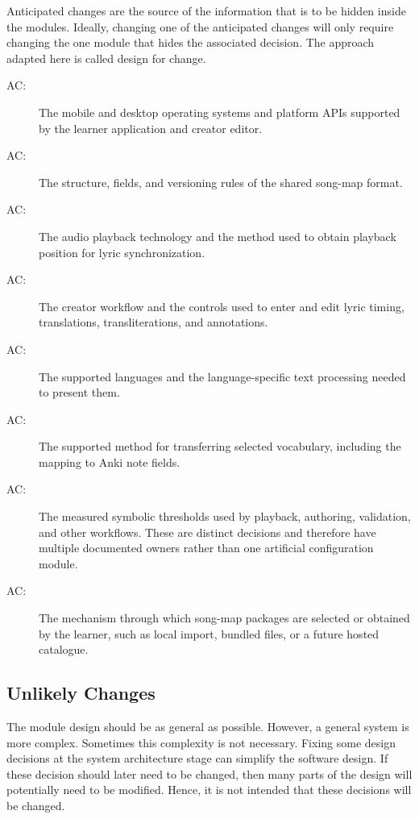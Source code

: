 \documentclass[12pt, titlepage]{article}
\newcounter{acnum}
\newcommand{\actheacnum}{AC\theacnum}
\begin{document}
Anticipated changes are the source of the information that is to be hidden
inside the modules. Ideally, changing one of the anticipated changes will only
require changing the one module that hides the associated decision. The approach
adapted here is called design for
change.

\begin{description}
\item[ \actheacnum \label{acPlatforms}:] The mobile and
  desktop operating systems and platform APIs supported by the learner
  application and creator editor.
\item[ \actheacnum \label{acSongMap}:] The structure,
  fields, and versioning rules of the shared song-map format.
\item[ \actheacnum \label{acAudio}:] The audio playback
  technology and the method used to obtain playback position for lyric
  synchronization.
\item[ \actheacnum \label{acAuthoring}:] The creator
  workflow and the controls used to enter and edit lyric timing, translations,
  transliterations, and annotations.
\item[ \actheacnum \label{acLanguage}:] The supported
  languages and the language-specific text processing needed to present them.
\item[ \actheacnum \label{acAnki}:] The supported method
  for transferring selected vocabulary, including the mapping to Anki note
  fields.
\item[ \actheacnum \label{acThresholds}:] The measured
  symbolic thresholds used by playback, authoring, validation, and other
  workflows. These are distinct decisions and therefore have multiple
  documented owners rather than one artificial configuration module.
\item[ \actheacnum \label{acDelivery}:] The mechanism
  through which song-map packages are selected or obtained by the learner,
  such as local import, bundled files, or a future hosted catalogue.
\end{description}

\subsection{Unlikely Changes} \label{SecUchange}

The module design should be as general as possible. However, a general system is
more complex. Sometimes this complexity is not necessary. Fixing some design
decisions at the system architecture stage can simplify the software design. If
these decision should later need to be changed, then many parts of the design
will potentially need to be modified. Hence, it is not intended that these
decisions will be changed.
\end{document}
